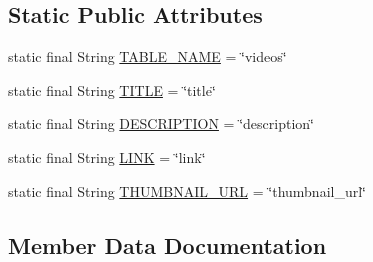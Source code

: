 \subsection*{Static Public Attributes}
\begin{DoxyCompactItemize}
\item 
static final String \hyperlink{classorg_1_1buildmlearn_1_1toolkit_1_1videocollectiontemplate_1_1data_1_1VideoContract_1_1Videos_ad9d1c9bb091b79918ab1161ef60b5a13}{T\+A\+B\+L\+E\+\_\+\+N\+A\+ME} = \char`\"{}videos\char`\"{}
\item 
static final String \hyperlink{classorg_1_1buildmlearn_1_1toolkit_1_1videocollectiontemplate_1_1data_1_1VideoContract_1_1Videos_ab56fcb143ed8a14c46cf81833532d9a9}{T\+I\+T\+LE} = \char`\"{}title\char`\"{}
\item 
static final String \hyperlink{classorg_1_1buildmlearn_1_1toolkit_1_1videocollectiontemplate_1_1data_1_1VideoContract_1_1Videos_ae493aa1643c6a5909ee6b5a311e74a44}{D\+E\+S\+C\+R\+I\+P\+T\+I\+ON} = \char`\"{}description\char`\"{}
\item 
static final String \hyperlink{classorg_1_1buildmlearn_1_1toolkit_1_1videocollectiontemplate_1_1data_1_1VideoContract_1_1Videos_a6de796d5b3a9f59476ddcf029ff6baf8}{L\+I\+NK} = \char`\"{}link\char`\"{}
\item 
static final String \hyperlink{classorg_1_1buildmlearn_1_1toolkit_1_1videocollectiontemplate_1_1data_1_1VideoContract_1_1Videos_a8e2b9a195d7feb786f51ddd645b4c53e}{T\+H\+U\+M\+B\+N\+A\+I\+L\+\_\+\+U\+RL} = \char`\"{}thumbnail\+\_\+url\char`\"{}
\end{DoxyCompactItemize}


\subsection{Member Data Documentation}
